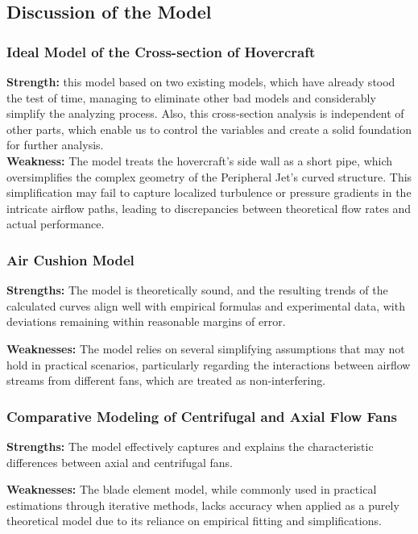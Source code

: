 \subsection{Discussion of the Model}

\subsubsection{Ideal Model of the Cross-section of
Hovercraft}

\textbf{Strength:} this model based on two existing models, which have already stood the test of time, managing to eliminate other bad models and considerably simplify the analyzing process. Also, this cross-section analysis is independent of other parts, which enable us to control the variables and create a solid foundation for further analysis.\\
\textbf{Weakness:} The model treats the hovercraft’s side wall as a short pipe, which oversimplifies the complex geometry of the Peripheral Jet’s curved structure. This simplification may fail to capture localized turbulence or pressure gradients in the intricate airflow paths, leading to discrepancies between theoretical flow rates and actual performance.\\

\subsubsection{Air Cushion Model}

\textbf{Strengths:} The model is theoretically sound, and the resulting trends of the calculated curves align well with empirical formulas and experimental data, with deviations remaining within reasonable margins of error.

\textbf{Weaknesses:} The model relies on several simplifying assumptions that may not hold in practical scenarios, particularly regarding the interactions between airflow streams from different fans, which are treated as non-interfering.

\subsubsection{Comparative Modeling of Centrifugal and Axial Flow Fans}

\textbf{Strengths:} The model effectively captures and explains the characteristic differences between axial and centrifugal fans.

\textbf{Weaknesses:} The blade element model, while commonly used in practical estimations through iterative methods, lacks accuracy when applied as a purely theoretical model due to its reliance on empirical fitting and simplifications.


